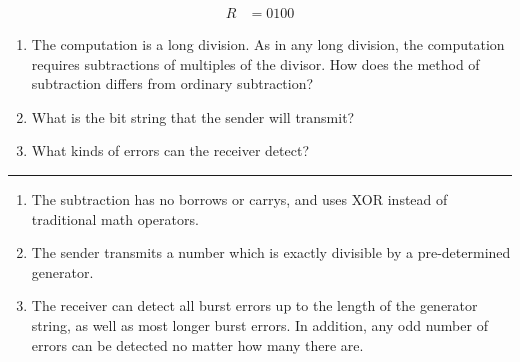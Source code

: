 \documentclass[twoside]{article}
\newenvironment{answer}
  {\vspace*{0.2cm} \rule{12cm}{0.04cm} \vspace*{0.2cm}}
  {\vspace*{0.2cm}}
\begin{document}
\begin{enumerate}
  \begin{align*}
    R & = 0100
    \end{align*}

  \begin{enumerate}
    \item The computation is a long division. As in any long division, the computation
      requires subtractions of multiples of the divisor. How does the method of subtraction
      differs from ordinary subtraction? 
    \item What is the bit string that the sender will transmit?
    \item What kinds of errors can the receiver detect?
    \end{enumerate}

  \begin{answer}

  \begin{enumerate}
    \item The subtraction has no borrows or carrys, and uses XOR instead of traditional 
	math operators.
    \item The sender transmits a number which is exactly divisible by a pre-determined 
	generator.
    \item The receiver can detect all burst errors up to the length of the 
	generator string, as well as most longer burst errors. In addition, any 
	odd number of errors can be detected no matter how many there are.
    \end{enumerate}

    \end{answer}

  \end{enumerate}
\end{document}

